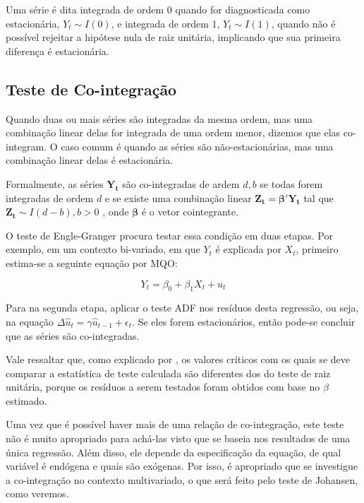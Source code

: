 \documentclass[a4paper,
               article,
               12pt,
               openany,
               oneside,
               english,
               brazil]{abntex2}
\numberwithin{equation}{section}
\begin{document}
    Uma série é dita integrada de ordem 0 quando for diagnosticada como estacionária, $ Y_t \sim I(0) $, e integrada de ordem 1, $ Y_t \sim I(1) $, quando não é possível rejeitar a hipótese nula de raiz unitária, implicando que sua primeira diferença é estacionária.

    \subsection{Teste de Co-integração}

    Quando duas ou mais séries são integradas da mesma ordem, mas uma combinação linear delas for integrada de uma ordem menor, dizemos que elas co-integram. O caso comum é quando as séries são não-estacionárias, mas uma combinação linear delas é estacionária.
    
    Formalmente, as séries $ \mathbf{Y_t} $ são co-integradas de ardem $ d, b $ se todas forem integradas de ordem $ d $ e se existe uma combinação linear $ \mathbf{Z_t} = \pmb{\beta}'\mathbf{Y_t} $ tal que $ \mathbf{Z_t} \sim I(d - b), b > 0 $ \cite[p.~245]{lutkepool}, onde $ \pmb{\beta} $ é o vetor cointegrante.

    O teste de Engle-Granger procura testar essa condição em duas etapas. Por exemplo, em um contexto bi-variado, em que $ Y_t $ é explicada por $ X_t $, primeiro estima-se a seguinte equação por MQO:

    \begin{equation}
        Y_t = \beta_0 + \beta_1 X_t + u_t \label{engle-granger}
    \end{equation}

    Para na segunda etapa, aplicar o teste ADF nos resíduos desta regressão, ou seja, na equação $ \Delta \hat{u}_t = \gamma \hat{u}_{t-1} + \epsilon_{t} $. Se eles forem estacionários, então pode-se concluir que as séries são co-integradas.

    Vale ressaltar que, como explicado por \textcite[p.~756]{gujarati}, os valores críticos com os quais se deve comparar a estatística de teste calculada são diferentes dos do teste de raiz unitária, porque os resíduos a serem testados foram obtidos com base no $ \beta $ estimado.

    Uma vez que é possível haver mais de uma relação de co-integração, este teste não é muito apropriado para achá-las visto que se baseia nos resultados de uma única regressão. Além disso, ele depende da especificação da equação, de qual variável é endógena e quais são exógenas. Por isso, é apropriado que se investigue a co-integração no contexto multivariado, o que será feito pelo teste de Johansen, como veremos.
\end{document}
